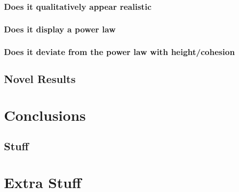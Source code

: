 \documentclass{book}
\begin{document}
\subsection{Does it qualitatively appear realistic}
\subsection{Does it display a power law}
\subsection{Does it deviate from the power law with height/cohesion}

\section{Novel Results}



\chapter{Conclusions}\label{Conclusions}

\section{Stuff}


\appendix

\noappendicestocpagenum	 %
\addappheadtotoc	%

\renewcommand{\theequation}{A-\arabic{equation}} %
\setcounter{equation}{0}  %

\renewcommand{\thesection}{A-\arabic{section}} %
\setcounter{section}{0}  %

\renewcommand{\thetable}{A-\arabic{table}} %
\setcounter{table}{0}  %

\chapter{Extra Stuff}\label{Extra}
\end{document}
